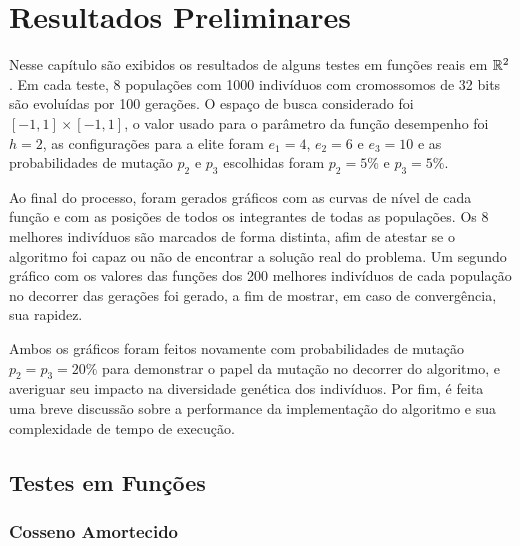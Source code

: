 \chapter{Resultados Preliminares}\label{cap_resultados}

Nesse capítulo são exibidos os resultados de alguns testes em funções reais em $\mathbb{R}^2$. Em cada teste, 
8 populações com 1000 indivíduos com cromossomos de 32 bits são evoluídas por 100 gerações. O espaço de busca
considerado foi $ [-1,1] \times [-1, 1] $, o valor usado para o parâmetro da função desempenho foi $h = 2$,
as configurações para a elite foram $e_1 = 4$, $e_2 = 6$ e $e_3 = 10$ e as probabilidades de mutação $p_2$ e $p_3$ escolhidas
foram $p_2 = 5\%$ e $p_3 = 5\%$.

Ao final do processo,
foram gerados gráficos com as curvas de nível de cada função e com as posições de todos os
integrantes de todas as populações. Os 8 melhores indivíduos são marcados de forma distinta,
afim de atestar se o algoritmo foi capaz ou não de encontrar a solução real do problema.
Um segundo gráfico com os valores das funções dos 200 melhores indivíduos de cada população
no decorrer das gerações foi gerado, a fim de mostrar, em caso de convergência, sua rapidez.

Ambos os gráficos foram feitos novamente com probabilidades de mutação $p_2 = p_3 = 20\%$
para demonstrar o papel da mutação no decorrer do algoritmo, e averiguar seu impacto na diversidade genética
dos indivíduos.
Por fim, é feita uma breve discussão sobre a performance da implementação do algoritmo e sua
complexidade de tempo de execução.

\section{Testes em Funções}

\subsection{Cosseno Amortecido}


